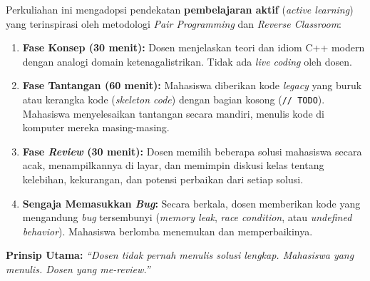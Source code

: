 \documentclass[12pt,a4paper]{article}
\begin{document}
\begin{tcolorbox}[colback=lightblue, colframe=uniblue, title={\textbf{Model Tutor \& Murid Aktif}}, fonttitle=\bfseries\color{white}, coltitle=white, colbacktitle=uniblue]
Perkuliahan ini mengadopsi pendekatan \textbf{pembelajaran aktif} (\textit{active learning}) yang terinspirasi oleh metodologi \textit{Pair Programming} dan \textit{Reverse Classroom}:

\begin{enumerate}[itemsep=0.3cm]
    \item \textbf{Fase Konsep (30 menit):} Dosen menjelaskan teori dan idiom C++ modern dengan analogi domain ketenagalistrikan. Tidak ada \textit{live coding} oleh dosen.

    \item \textbf{Fase Tantangan (60 menit):} Mahasiswa diberikan kode \textit{legacy} yang buruk atau kerangka kode (\textit{skeleton code}) dengan bagian kosong (\texttt{// TODO}). Mahasiswa menyelesaikan tantangan secara mandiri, menulis kode di komputer mereka masing-masing.

    \item \textbf{Fase \textit{Review} (30 menit):} Dosen memilih beberapa solusi mahasiswa secara acak, menampilkannya di layar, dan memimpin diskusi kelas tentang kelebihan, kekurangan, dan potensi perbaikan dari setiap solusi.

    \item \textbf{Sengaja Memasukkan \textit{Bug}:} Secara berkala, dosen memberikan kode yang mengandung \textit{bug} tersembunyi (\textit{memory leak}, \textit{race condition}, atau \textit{undefined behavior}). Mahasiswa berlomba menemukan dan memperbaikinya.
\end{enumerate}

\textbf{Prinsip Utama:} \textit{``Dosen tidak pernah menulis solusi lengkap. Mahasiswa yang menulis. Dosen yang me-review.''}
\end{tcolorbox}
\end{document}
